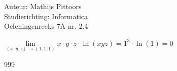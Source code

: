 \documentclass[a4paper]{article}
\newcommand{\llim}{\lim\limits}
\begin{document}
  
\noindent \large Auteur: Mathijs Pittoors \\
\noindent \large Studierichting: Informatica\\
\noindent \large Oefeningenreeks 7A nr. 2.4\\

\medskip

\normalsize

$\llim_{(x,y,z) \rightarrow (1,1,1)} x \cdot y \cdot z \cdot \ln(xyz) = 1^3 \cdot \ln(1) = 0$

\begin{thebibliography}{999}
\end{thebibliography}
\end{document}
